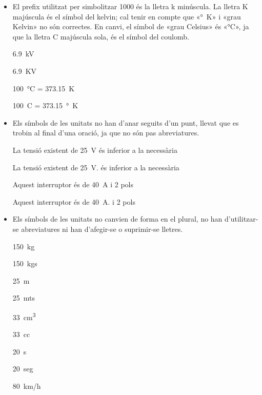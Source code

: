 \begin{itemize}

\item El prefix utilitzat per simbolitzar 1000 és la lletra k minúscula.  La lletra K majúscula és el símbol del  kelvin; cal tenir en compte que «\unit{\degree K}»  i «grau Kelvin» no són correctes. En canvi, el símbol de «grau Celsius» és «\unit{\degreeCelsius}», ja que la lletra C majúscula sola, és el símbol del coulomb.

\textcolor{Green}\faCheckSquare{} \qty{6,9}{kV}

\textcolor{Red}\faTimesCircle{} \qty{6,9}{KV}

\textcolor{Green}\faCheckSquare{} \qty{100}{\degreeCelsius} = \qty{373,15}{K}

\textcolor{Red}\faTimesCircle{} \qty{100}{C} = \qty{373,15}{\degree K}

\item Els símbols de les unitats no han d'anar seguits d'un punt, llevat que es trobin al final d'una oració, ja que no són pas
abreviatures.

\textcolor{Green}\faCheckSquare{} La tensió existent de \qty{25}{V} és inferior a la necessària

\textcolor{Red}\faTimesCircle{} La tensió existent de \qty{25}{V}. és inferior a la necessària

\textcolor{Green}\faCheckSquare{}  Aquest interruptor és de \qty{40}{A} i 2 pols

\textcolor{Red}\faTimesCircle{}  Aquest interruptor és de \qty{40}{A}. i 2 pols


\item Els símbols de les unitats no canvien de forma en el plural, no han
d'utilitzar-se abreviatures ni han d'afegir-se o suprimir-se
lletres.

\textcolor{Green}\faCheckSquare{} \qty{150}{kg}

\textcolor{Red}\faTimesCircle{} \qty{150}{kgs}

\textcolor{Green}\faCheckSquare{} \qty{25}{m}

\textcolor{Red}\faTimesCircle{} \qty{25}{mts}

\textcolor{Green}\faCheckSquare{} \qty{33}{cm^3}

\textcolor{Red}\faTimesCircle{} \qty{33}{cc}

\textcolor{Green}\faCheckSquare{} \qty{20}{s}

\textcolor{Red}\faTimesCircle{} \qty{20}{seg}

\textcolor{Green}\faCheckSquare{} \qty{80}{km/h}


\end{itemize}
